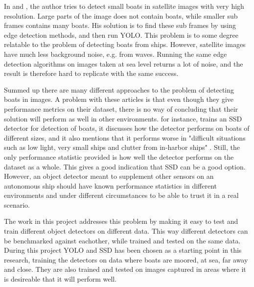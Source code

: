 In \citep{Hog1} and \citep{Hog2}, the author tries to detect small boats in satellite images with very high resolution. Large parts of the image does not contain boats, while smaller sub frames contains many boats. His solution is to find these sub frames by using edge detection methods, and then run YOLO. This problem is to some degree relatable to the problem of detecting boats from ships. However, satellite images have much less background noise, e.g. from waves. Running the same edge detection algorithms on images taken at sea level returns a lot of noise, and the result is therefore hard to replicate with the same success. 

\vspace{3mm}

Summed up there are many different approaches to the problem of detecting boats in images. A problem with these articles is that even though they give performance metrics on their dataset, there is no way of concluding that their solution will perform as well in other environments. \citep{SSD_detection2018} for instance, trains an SSD detector for detection of boats, it discusses how the detector performs on boats of different sizes, and it also mentions that it performs worse in "difficult situations such as low light, very small ships and clutter from in-harbor ships" \citep{SSD_detection2018}. Still, the only performance statistic provided is how well the detector performs on the dataset as a whole. This gives a good indication that SSD can be a good option. However, an object detector meant to supplement other sensors on an autonomous ship should have known performance statistics in different environments and under different circumstances to be able to trust it in a real scenario. 

\vspace{3mm}

The work in this project addresses this problem by making it easy to test and train different object detectors on different data. This way different detectors can be benchmarked against eachother, while trained and tested on the same data. During this project YOLO and SSD has been chosen as a starting point in this research, training the detectors on data where boats are moored, at sea, far away and close. They are also trained and tested on images captured in areas where it is desireable that it will perform well.





\cleardoublepage